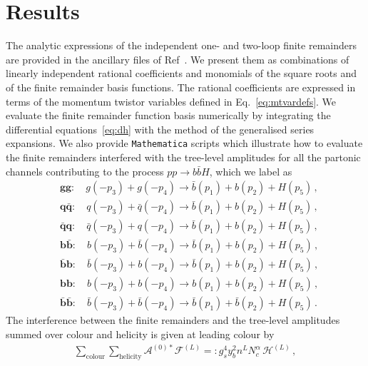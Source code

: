 \documentclass[main.tex]{subfiles}
\begin{document}
\section{Results}
\label{Hbbsec:results}
The analytic expressions of the independent one- and two-loop finite remainders are provided in the ancillary files of Ref~\cite{Badger:2021ega}. We present them as combinations of linearly independent rational coefficients and monomials of the square roots and of the finite remainder basis functions. The rational coefficients are expressed in terms of the momentum twistor variables defined in Eq.~\eqref{eq:mtvardefs}. We evaluate the finite remainder function basis numerically by integrating the differential equations~\eqref{eq:dh} with the method of the generalised series expansions. We also provide \texttt{Mathematica} scripts which illustrate how to evaluate the finite remainders interfered with the tree-level amplitudes for all the partonic channels contributing to the process $pp\to b\bar{b} H$, which we label as
\begin{equation}
\label{eq:channel_definition}
\begin{aligned}
&\mathbf{gg}:       \quad  g(-p_3) + g(-p_4) \rightarrow \bar{b}(p_1) + b(p_2) + H(p_5) \,, \\
&\mathbf{q\bar{q}}: \quad  q(-p_3) + \bar{q}(-p_4) \rightarrow \bar{b}(p_1) + b(p_2) + H(p_5) \,, \\
&\mathbf{\bar{q}q}: \quad \bar{q}(-p_3) + q(-p_4) \rightarrow \bar{b}(p_1) + b(p_2) + H(p_5) \,, \\
&\mathbf{b\bar{b}}: \quad b(-p_3) + \bar{b}(-p_4) \rightarrow \bar{b}(p_1) + b(p_2) + H(p_5) \,, \\
&\mathbf{\bar{b}b}: \quad \bar{b}(-p_3) + b(-p_4) \rightarrow \bar{b}(p_1) + b(p_2) + H(p_5) \,, \\
&\mathbf{bb}: \quad b(-p_3) + b(-p_4) \rightarrow b(p_1) + b(p_2) + H(p_5) \,, \\
&\mathbf{\bar{b}\bar{b}}: \quad \bar{b}(-p_3) + \bar{b}(-p_4) \rightarrow \bar{b}(p_1) + \bar{b}(p_2) + H(p_5) \,.
\end{aligned}
\end{equation}
The interference between the finite remainders and the tree-level amplitudes summed over colour and helicity is given at leading colour by 
\begin{align}
\sum_{\text{colour}} \sum_{\text{helicity}} \mathcal{A}^{(0) *} \mathcal{F}^{(L)} =: g_s^4 y_b^2 n^L N_c^{\alpha} \, \mathcal{H}^{(L)}\,,
\end{align}
\end{document}
